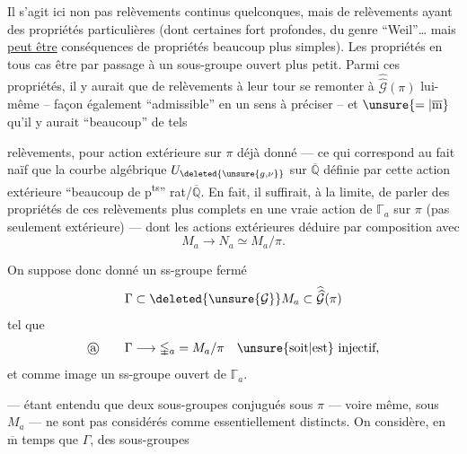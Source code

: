 Il s'agit ici non pas  relèvements continus quelconques, mais de relèvements ayant des propriétés particulières (dont certaines fort profondes, du genre ``Weil''\ldots\deleted{)} mais \uline{peut être} conséquences de propriétés beaucoup plus simples). Les propriétés   en tous cas être   par passage à un sous-groupe ouvert plus petit. Parmi ces propriétés, il y aurait que   de relèvements  à leur tour se remonter à $\widehat{\widehat{\mathcal G}}(\pi)$ lui-même --  façon également ``admissible'' en un sens à préciser -- et $\unsure{=|\overline{\mathrm m}}$ qu'il y aurait ``beaucoup''  de tels

 relèvements, pour  action extérieure sur $\pi$ déjà donné --- ce qui correspond au fait naïf que la courbe algébrique $U_{\deleted{\unsure{g,\nu}}}$ sur $\overline{\mathbb Q}$ définie par cette action extérieure  ``beaucoup de p\textsuperscript{ts}'' rat/$\overline{\mathbb Q}$. En fait, il suffirait, à la limite, de parler des  propriétés de ces relèvements plus complets en une vraie action de  $\mathbb{\Gamma}_a$ sur $\pi$ (pas seulement extérieure) --- dont les actions extérieures   déduire par composition avec
\[
M_a \longrightarrow N_a \simeq M_a/\pi.
\]

 On suppose donc donné un ss-groupe fermé
\[
\Gamma \subset \deleted{\unsure{\mathcal G}} M_a \subset \widehat{\widehat{\mathcal G}}(\pi)
\]
tel que
\[
\text{\textcircled{a}}\qquad
\Gamma \longrightarrow \mathbb{\Gamma}_a
 = M_a/\pi
\quad \text{\unsure{soit|est} injectif,}
\]
et  comme image un ss-groupe ouvert de $\mathbb{\Gamma}_a$.

--- étant entendu que deux sous-groupes conjugués sous $\pi$ --- voire même,  sous $M_a$ --- ne sont pas considérés comme essentiellement distincts. On considère, en $\overline{\mathrm m}$ temps que $\Gamma$, des sous-groupes

